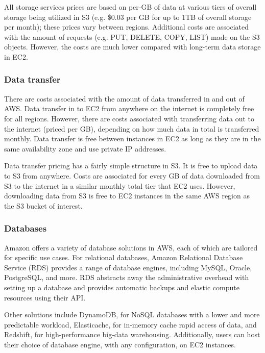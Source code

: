 \documentclass{frontiersSCNS} %
\begin{document}
All storage services prices are based on per-GB of data at various tiers of overall storage being utilized in S3 (e.g. \$0.03 per GB for up to 1TB of overall storage per month); these prices vary between regions. Additional costs are associated with the amount of requests (e.g. PUT, DELETE, COPY, LIST) made on the S3 objects. However, the costs are much lower compared with long-term data storage in EC2.

\subsubsection{Data transfer}
There are costs associated with the amount of data transferred in and out of AWS. Data transfer in to EC2 from anywhere on the internet is completely free for all regions. However, there are costs associated with transferring data out to the internet (priced per GB), depending on how much data in total is transferred monthly. Data transfer is free between instances in EC2 as long as they are in the same availability zone and use private IP addresses.


Data transfer pricing has a fairly simple structure in S3. It is free to upload data to S3 from anywhere. Costs are associated for every GB of data downloaded from S3 to the internet in a similar monthly total tier that EC2 uses. However, downloading data from S3 is free to EC2 instances in the same AWS region as the S3 bucket of interest.

\subsubsection{Databases}
Amazon offers a variety of database solutions in AWS, each of which are tailored for specific use cases. For relational databases, Amazon Relational Database Service (RDS) provides a range of database engines, including MySQL, Oracle, PostgreSQL, and more. RDS abstracts away the administrative overhead with setting up a database and provides automatic backups and elastic compute resources using their API.


Other solutions include DynamoDB, for NoSQL databases with a lower and more predictable workload, Elasticache, for in-memory cache rapid access of data, and Redshift, for high-performance big-data warehousing. Additionally, users can host their choice of database engine, with any configuration, on EC2 instances.

\end{document}
